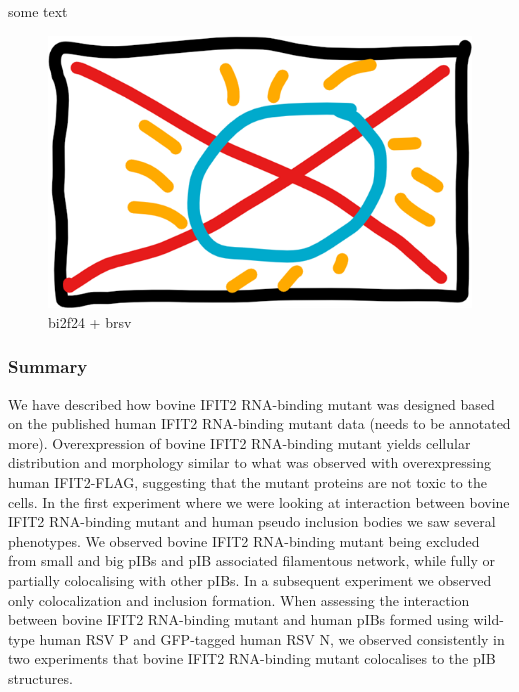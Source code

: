 some text

\begin{figure}
    \centering
    \includegraphics[width=0.5\linewidth]{10. Chapter 5//Figs//04. IFIT2-mutant confocal/00. placeholder.png}
    \caption[bi2f24 + brsv]{bi2f24 + brsv}
    \label{bi2f24 + brsv}
\end{figure}

\subsubsection{Summary}
We have described how bovine IFIT2 RNA-binding mutant was designed based on the published human IFIT2 RNA-binding mutant data (needs to be annotated more). Overexpression of bovine IFIT2 RNA-binding mutant yields cellular distribution and morphology similar to what was observed with overexpressing human IFIT2-FLAG, suggesting that the mutant proteins are not toxic to the cells. In the first experiment where we were looking at interaction between bovine IFIT2 RNA-binding mutant and human pseudo inclusion bodies we saw several phenotypes. We observed bovine IFIT2 RNA-binding mutant being excluded from small and big pIBs and pIB associated filamentous network, while fully or partially colocalising with other pIBs. In a subsequent experiment we observed only colocalization and inclusion formation. When assessing the interaction between bovine IFIT2 RNA-binding mutant and human pIBs formed using wild-type human RSV P and GFP-tagged human RSV N, we observed consistently in two experiments that bovine IFIT2 RNA-binding mutant colocalises to the pIB structures.
